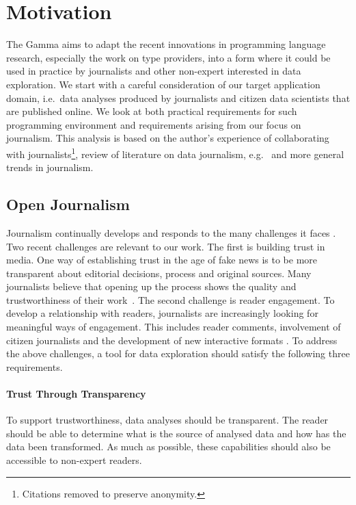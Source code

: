 \documentclass{sigchi}
\begin{document}
\section{Motivation}
\label{sec:motivation}

The Gamma aims to adapt the recent innovations in programming language research, especially the
work on type providers, into a form where it could be used in practice by journalists and other
non-expert interested in data exploration. We start with a careful consideration of our target
application domain, i.e.~data analyses produced by journalists and citizen data scientists that
are published online. We look at both practical requirements for such programming environment
and requirements arising from our focus on journalism. This analysis is based on the author's
experience of collaborating with journalists\footnote{Citations removed to preserve anonymity.},
review of literature on data journalism, e.g.~\cite{ddj,edcj17,edcj18} and more general trends in
journalism.

\subsection{Open Journalism}
Journalism continually develops and responds to the many challenges it faces \cite{future}.
Two recent challenges are relevant to our work. The first is building trust in media.
One way of establishing trust in the age of fake news is to be more transparent about editorial
decisions, process and original sources. Many journalists believe that opening up the process
shows the quality and trustworthiness of their work~\cite{transparency}.
The second challenge is reader engagement. To develop a relationship with readers, journalists are
increasingly looking for meaningful ways of engagement. This includes reader comments, involvement
of citizen journalists \cite{comments,citizen} and the development of new interactive formats
\cite{youdraw}. To address the above challenges, a tool for data exploration should satisfy the
following three requirements.

\paragraph{Trust Through Transparency}
To support trustworthiness, data analyses should be transparent. The reader should be able to
determine what is the source of analysed data and how has the data been transformed. As much as
possible, these capabilities should also be accessible to non-expert readers.
\end{document}
